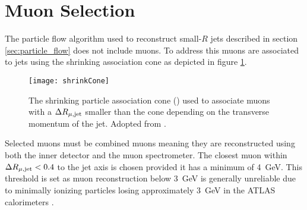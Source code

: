 \section{Muon Selection}
\label{sec:MuonSelection}
The particle flow algorithm used to reconstruct small-$R$ jets described in section \ref{sec:particle_flow} does not include muons. To address this muons are associated to jets using the shrinking association \DeltaR cone as depicted in figure \ref{fig:shrinkCone}.
\begin{figure}[]
  \centering
  \texttt{[image: shrinkCone]}
  \caption{The shrinking particle association cone () used to associate muons with a $\Delta R_\mathrm{\mu, jet}$ smaller than the cone depending on the transverse momentum of the jet. Adopted from \citep{Jacobs:2697316}. }
  \label{fig:shrinkCone}
\end{figure}
Selected muons must be combined muons meaning they are reconstructed using both the inner detector and the muon spectrometer. The closest muon within $\Delta R_\mathrm{\mu, jet} < 0.4$ to the jet axis is chosen provided it has a minimum \pt of \qty{4}{GeV}. This threshold is set as muon reconstruction below \qty{3}{GeV} is generally unreliable due to minimally ionizing particles losing approximately \qty{3}{GeV} in the ATLAS calorimeters \citep{expectedPerformanceAtlas}.

